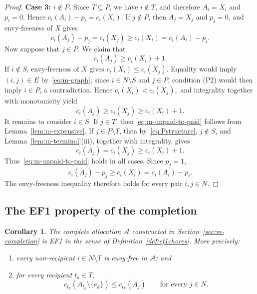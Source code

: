 \documentclass[sigconf,anonymous]{aamas}
\newcommand{\agents}{N}
\newcommand{\subsidy}{p}
\newcommand{\cost}{c}
\theoremstyle{acmplain}
\newtheorem{corollary}[theorem]{Corollary}
\theoremstyle{acmdefinition}
\theoremstyle{acmplain}
\begin{document}
\begin{proof}
\smallskip
\noindent\textbf{Case 3: $i\notin P$.}
Since $T\subseteq P$, we have $i\notin T$, and therefore $A_i=X_i$ and $\subsidy_i=0$. Hence \(\cost_i(A_i)-\subsidy_i=\cost_i(X_i). \) If $j\notin P$, then $A_j=X_j$ and $\subsidy_j=0$, and envy-freeness of $X$ gives
\[
    \cost_i(A_j)-\subsidy_j
    =\cost_i(X_j)
    \geq\cost_i(X_i)=\cost_i(A_i)-\subsidy_i.
\]
Now suppose that $j\in P$. We claim that
\begin{equation}
\label{eq:m-unpaid-to-paid}
    \cost_i(A_j)\geq \cost_i(X_i)+1.
\end{equation}
If $i\notin S$, envy-freeness of $X$ gives $\cost_i(X_i)\leq\cost_i(X_j)$. Equality would imply $(i,j)\in E$ by~\eqref{eq:m-graph}; since $i\in\agents\setminus S$ and $j\in P$, condition \textnormal{(P2)} would then imply $i\in P$, a contradiction. Hence \(\cost_i(X_i)<\cost_i(X_j), \) and integrality together with monotonicity yield
\[
\cost_i(A_j)\geq\cost_i(X_j)\geq\cost_i(X_i)+1.
\] It remains to consider $i\in S$. If $j\in T$, then \eqref{eq:m-unpaid-to-paid} follows from Lemma~\ref{lem:m-expensive}. If $j\in P\setminus T$, then by~\eqref{eq:Pstructure}, $j\notin S$, and Lemma~\ref{lem:m-terminal}(iii), together with integrality, gives
\[
    \cost_i(A_j)=\cost_i(X_j)\geq\cost_i(X_i)+1.
\]
Thus~\eqref{eq:m-unpaid-to-paid} holds in all cases. Since $\subsidy_j=1$,
\[
    \cost_i(A_j)-\subsidy_j
    \geq\cost_i(X_i)
    =\cost_i(A_i)-\subsidy_i.
\]
The envy-freeness inequality therefore holds for every pair $i,j\in\agents$. \end{proof}

\subsection{The EF1 property of the completion}


\begin{corollary}
\label{cor:ef1}
The complete allocation $\mathcal{A}$ constructed in Section~\ref{sec:m-completion} is EF1 in the sense of Definition~\ref{def:ef1chores}. More precisely:
\begin{enumerate}
    \item [(i)] every non-recipient $i\in N\setminus T$ is envy-free in  $\mathcal{A}$; and
    \item [(ii)] for every recipient $t_k\in T$,
    \[ c_{t_k}(A_{t_k}\setminus\{e_k\}) \leq c_{t_k}(A_j) \qquad\text{for every }j\in N.
    \]
\end{enumerate}
\end{corollary}
\end{document}
